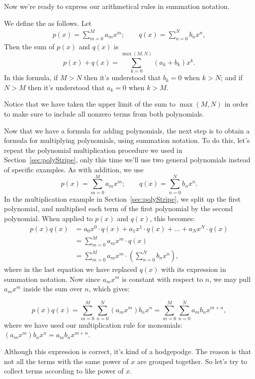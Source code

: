Now we're ready to express our arithmetical rules in summation notation. 

\begin{defn}\label{defsumpoly}
We define the  as follows.  Let
\begin{align*}
p(x)  = \sum^{M}_{m=0} a_m x^m ; \qquad
q(x)  = \sum^{N}_{n=0} b_n x^n,
\end{align*}
Then the sum of $p(x)$ and $q(x)$ is
\[
p(x) + q(x) =  \sum_{k=0}^{\max(M,N)} (a_k + b_k) x^k.
\]
In this formula, if $M>N$ then it's understood that $b_k=0$ when $k>N$; and if $N>M$ then it's understood that $a_k = 0$ when $k>M$.
 \end{defn}

Notice that we have taken the upper limit of the sum to $\max(M,N)$ in order to make sure to include all nonzero terms from both polynomials. 

Now that we have a formula for adding polynomials, the next step is to obtain a formula for multiplying polynomials, using summation notation.
To do this, let's repeat the polynomial multiplication procedure we used in Section~\ref{sec:polyStripe}, only this time we'll use two general polynomials instead of specific examples. As with addition, we use
$$
p(x)  = \sum^{M}_{m=0} a_m x^m; \qquad
q(x)  = \sum^{N}_{n=0} b_n x^n.
$$
In the multiplication example in Section~\ref{sec:polyStripe}, we split up the first polynomial, and multiplied each term of the first polynomial by the second polynomial. When applied to $p(x)$ and $q(x)$, this becomes:
\begin{align*}
p(x)q(x)&= a_0x^0 \cdot q(x) + a_1x^1 \cdot q(x) + \ldots + a_Nx^N \cdot q(x) \\
&= \sum^M_{m=0} a_mx^m \cdot q(x)\\
&= \sum^M_{m=0} a_mx^m \cdot \left(\sum^{N}_{n=0} b_n x^n\right),
\end{align*}
where in the last equation we have replaced $q(x)$ with its expression in summation notation. Now since $a_mx^m$ is constant with respect to $n$, we may pull $a_mx^m$ inside the sum over $n$, which gives:

\[
p(x) q(x) =\sum_{m=0}^{M}\sum_{n=0}^{N}(a_mx^m) b_n x^{n}=\sum_{m=0}^{M}\sum_{n=0}^{N}a_m b_n x^{m+n},
\]
where we have used our multiplication rule for monomials:  $(a_mx^m) b_n x^{n}=a_m b_n x^{m+n}$.

Although this expression is correct, it's kind of a hodgepodge. The reason is that not all the terms with the same power of $x$ are grouped together. So let's try to collect terms according to like power of $x$. 

